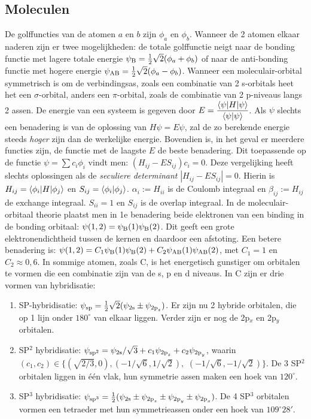 \subsection[~~Moleculen]{Moleculen}
De golffuncties van de atomen $a$ en $b$ zijn $\phi_a$ en $\phi_b$. Wanneer
de 2 atomen elkaar naderen zijn er twee mogelijkheden: de totale golffunctie
neigt naar de bonding functie met lagere totale energie
$\psi_{\rm B}=\mbox{$\frac{1}{2}$}\sqrt{2}(\phi_a+\phi_b)$ of naar de anti-bonding functie
met hogere energie $\psi_{\rm AB}=\mbox{$\frac{1}{2}$}\sqrt{2}(\phi_a-\phi_b)$. Wanneer
een moleculair-orbital symmetrisch is om de verbindingsas, zoals een
combinatie van 2 s-orbitals heet het een $\sigma$-orbital, anders een
$\pi$-orbital, zoals de combinatie van 2 p-niveaus langs 2 assen.
\npar
De energie van een systeem is gegeven door
$\displaystyle E=\frac{\left\langle \psi|H|\psi \right\rangle}{\left\langle \psi|\psi \right\rangle}$.
\npar
Als $\psi$ slechts een benadering is van de oplossing van $H\psi=E\psi$, zal
de zo berekende energie steeds {\it hoger} zijn dan de werkelijke energie.
Bovendien is, in het geval er meerdere functies zijn, de functie met de
laagste $E$ de beste benadering. Dit toepassende op de functie
$\psi=\sum c_i\phi_i$ vindt men: $(H_{ij}-ES_{ij})c_i=0$. Deze vergelijking
heeft slechts oplossingen als de {\it seculiere determinant}
$|H_{ij}-ES_{ij}|=0$. Hierin is $H_{ij}=\left\langle \phi_i|H|\phi_j \right\rangle$ en
$S_{ij}=\left\langle \phi_i|\phi_j \right\rangle$. $\alpha_i:=H_{ii}$ is de Coulomb integraal en
$\beta_{ij}:=H_{ij}$ de exchange integraal. $S_{ii}=1$ en $S_{ij}$ is de
overlap integraal.
\npar
In de moleculair-orbitaal theorie plaatst men in 1e benadering beide
elektronen van een binding in de bonding orbitaal:
$\psi(1,2)=\psi_{\rm B}(1)\psi_{\rm B}(2)$. Dit geeft een grote
elektronendichtheid tussen de kernen en daardoor een afstoting. Een betere
benadering is: $\psi(1,2)=C_1\psi_{\rm B}(1)\psi_{\rm B}(2)+C_2\psi_{\rm AB}(1)\psi_{\rm AB}(2)$,
met $C_1=1$ en $C_2\approx0,6$.
\npar
In sommige atomen, zoals C, is het energetisch gunstiger om orbitalen te
vormen die een combinatie zijn van de s, p en d niveaus. In C zijn er drie
vormen van hybridisatie:
\begin{enumerate}
\item SP-hybridisatie: $\psi_{\rm sp}=\mbox{$\frac{1}{2}$}\sqrt{2}(\psi_{\rm 2s}\pm\psi_{{\rm 2p}_z})$.
      Er zijn nu 2 hybride orbitalen, die op 1 lijn onder $180^\circ$ van
      elkaar liggen. Verder zijn er nog de 2p$_x$ en 2p$_y$ orbitalen.
\item SP$^2$ hybridisatie: $\psi_{\rm sp^2}=\psi_{\rm 2s}/\sqrt{3}+c_1\psi_{{\rm 2p}_z}+c_2\psi_{{\rm 2p}_y}$,
      waarin $(c_1,c_2)\in\{(\sqrt{2/3},0),(-1/\sqrt{6},1/\sqrt{2}),$ $(-1/\sqrt{6},-1/\sqrt{2})\}$.
      De 3 SP$^2$ orbitalen liggen in \'e\'en vlak, hun symmetrie assen maken
      een hoek van $120^\circ$.
\item SP$^3$ hybridisatie: $\psi_{\rm sp^3}=\mbox{$\frac{1}{2}$}(\psi_{\rm 2s}\pm\psi_{{\rm 2p}_z}\pm\psi_{{\rm 2p}_y}\pm\psi_{{\rm 2p}_x})$.
      De 4 SP$^3$ orbitalen vormen een tetraeder met hun symmetrieassen onder
      een hoek van $109^\circ 28'$.
\end{enumerate}

